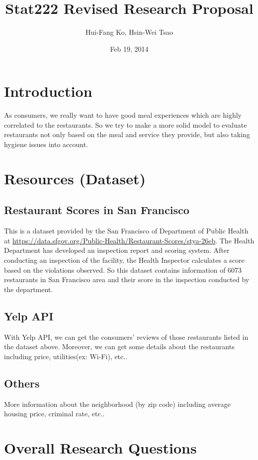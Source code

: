 \documentclass{article}
\title{Stat222 Revised Research Proposal}
\author{Hui-Fang Ko, Hsin-Wei Tsao}
\date{Feb 19, 2014}
\begin{document}
\maketitle

\section{Introduction}
As consumers, we really want to have good meal experiences which are highly correlated to the restaurants. So we try to make a more solid model to evaluate restaurants not only based on the meal and service they provide, but also taking hygiene issues into account.



\section{Resources (Dataset)}
\subsection{Restaurant Scores in San Francisco}
This is a dataset provided by the San Francisco of Department of Public Health at \url{https://data.sfgov.org/Public-Health/Restaurant-Scores/stya-26eb}. The Health Department has developed an inspection report and scoring system. After conducting an inspection of the facility, the Health Inspector calculates a score based on the violations observed. So this dataset contains information of 6073 restaurants in San Francisco area and their score in the inspection conducted by the department.

\subsection{Yelp API}
With Yelp API, we can get the consumers' reviews of those restaurants listed in the dataset above. Moreover, we can get some details about the restaurants including price, utilities(ex: Wi-Fi), etc.. 

\subsection{Others}
More information about the neighborhood (by zip code) including average housing price, criminal rate, etc..

\section{Overall Research Questions}
\end{document}
